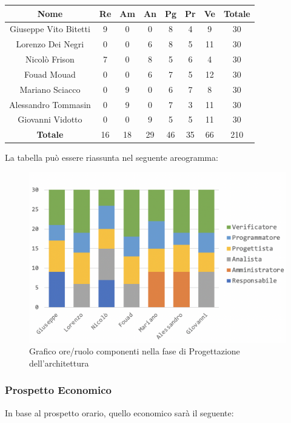 		\begin{longtable}{|c|c|c|c|c|c|c|c}
			\hline
			\rowcolor{lighter-grayer}
			\textbf{Nome} & \textbf{Re} & \textbf{Am} & \textbf{An} & \textbf{Pg}  & \textbf{Pr}   & \textbf{Ve} & \textbf{Totale} \\
			\hline
			\endfirsthead
			
			\hline
			Giuseppe Vito Bitetti 		& 9 & 0 & 0 & 8 & 4 & 9 & 30\\
			\hline
			\hline
			Lorenzo Dei Negri			& 0 & 0 & 6 & 8 & 5 & 11 & 30\\
			\hline
			\hline
			Nicolò Frison				   & 7 & 0 & 8 & 5 & 6 & 4 & 30\\
			\hline
			\hline
			Fouad Mouad 				& 0 & 0 & 6 & 7 & 5 & 12 & 30\\
			\hline
			\hline
			Mariano Sciacco 			& 0 & 9 & 0 & 6 & 7 & 8 & 30\\
			\hline
			\hline
			Alessandro Tommasin    & 0 & 9 & 0 & 7 & 3 & 11 & 30\\
			\hline
			\hline
			Giovanni Vidotto 			& 0 & 0 & 9 & 5 & 5 & 11 & 30\\
			\hline 
			\textbf{Totale}			 & 16 &  18 & 29 & 46 & 35 & 66 & 210\\
			\hline
		\end{longtable}
		\pagebreak
		
		La tabella può essere riassunta nel seguente areogramma:
		\begin{figure}[H]
			\centering
			\includegraphics[width=0.8\linewidth]{./images/progArch1.png}
			\caption{Grafico ore/ruolo componenti nella fase di Progettazione dell'architettura}
			\label{fig:grafico suddivione ruoli fase Progettazione archittetura}
		\end{figure}
	
		\subsubsection{Prospetto Economico}
		In base al prospetto orario, quello economico sarà il seguente: 
		

